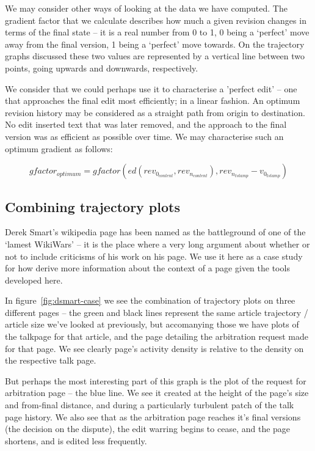 We may consider other ways of looking at the data we have
computed. The gradient factor that we calculate describes how much a
given revision changes in terms of the final state -- it is a real
number from 0 to 1, 0 being a `perfect' move away from the final
version, 1 being a `perfect' move towards. On the trajectory graphs
discussed these two values are represented by a vertical line between
two points, going upwards and downwards, respectively. 

We consider that we could perhaps use it to characterise a 'perfect
edit' -- one that approaches the final edit most efficiently; in a
linear fashion. An optimum revision history may be considered as a
straight path from origin to destination. No edit inserted text that
was later removed, and the approach to the final version was as
efficient as possible over time. We may characterise such an optimum
gradient as follows:


\[
  gfactor_{optimum} = gfactor(ed(rev_{0_{content}},
  rev_{n_{content}}), rev_{n_{tstamp}} - v_{0_{tstamp}})
\]

\subsection*{Combining trajectory plots}
Derek Smart's wikipedia page has been named as the battleground of one
of the `lamest WikiWars' -- it is the place where a very long argument
about whether or not to include criticisms of his work on his page.
We use it here as a case study for how derive more information about
the context of a page given the tools developed here.

In figure~\ref{fig:dsmart-case} we see the combination of trajectory
plots on three different pages -- the green and black lines represent
the same article trajectory / article size we've looked at previously,
but accomanying those we have plots of the talkpage for that article,
and the page detailing the arbitration request made for that page. We
see clearly page's activity density is relative to the density on the
respective talk page.

But perhaps the most interesting part of this graph is the plot of the
request for arbitration page -- the blue line. We see it created at
the height of the page's size and from-final distance, and during a
particularly turbulent patch of the talk page history. We also see
that as the arbitration page reaches it's final versions (the
decision on the dispute), the edit warring begins to cease, and the
page shortens, and is edited less frequently.

